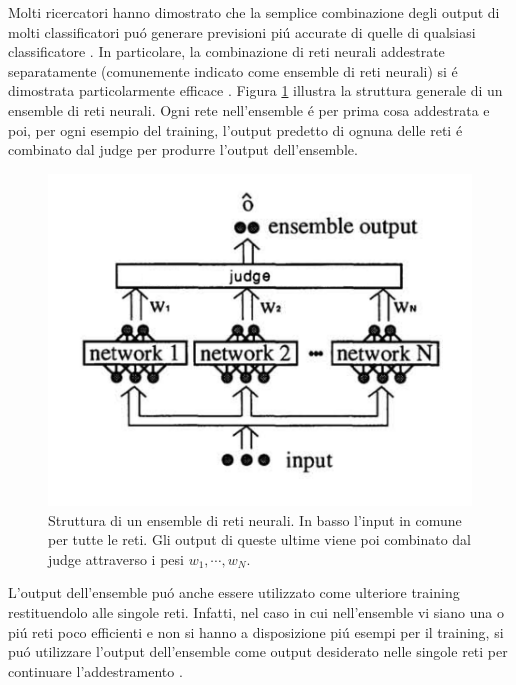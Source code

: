 \documentclass[a4paper,12pt]{report}
\begin{document}
 Molti ricercatori hanno dimostrato che la semplice combinazione degli output di molti classificatori pu\'o generare previsioni pi\'u accurate di quelle di qualsiasi classificatore \cite{clemen1989combining} \cite{wolpert1992stacked}. In particolare, la combinazione di reti neurali addestrate separatamente (comunemente indicato come ensemble di reti neurali) si \'e dimostrata particolarmente efficace \cite{alpaydin1993multiple} \cite{drucker1994boosting} \cite{krogh1995neural} \cite{maclin1995combining} \cite{perrone1992soft}. 
 Figura \ref{EnsembleStructurepng} illustra la struttura generale di un ensemble di reti neurali. Ogni rete nell'ensemble \'e per prima cosa addestrata e poi, per ogni esempio del training, l'output predetto di ognuna delle reti \'e combinato dal judge per produrre l'output dell'ensemble. 
 \begin{figure}[h!]
  \centering
  \includegraphics[scale=0.4]{EnsembleStructure.png}
  \caption{Struttura di un ensemble di reti neurali. In basso l'input in comune per tutte le reti. Gli output di queste ultime viene poi combinato dal judge attraverso i pesi $w_1, \cdots , w_N$.}
  \label{EnsembleStructurepng}
 \end{figure}
 
 L'output dell'ensemble pu\'o anche essere utilizzato come ulteriore training restituendolo alle singole reti. 
 Infatti, nel caso in cui nell'ensemble vi siano una o pi\'u reti poco efficienti e non si hanno a disposizione pi\'u esempi per il training, si pu\'o utilizzare l'output dell'ensemble come output desiderato nelle singole reti per continuare l'addestramento \cite{lincoln1990synergy}. 
 
\end{document}
